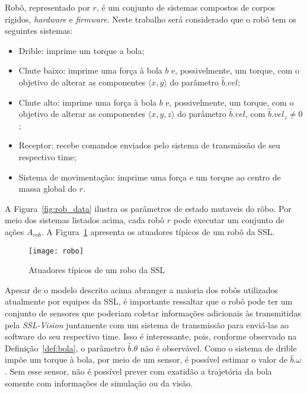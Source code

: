 \begin{defi}[Robô]
  Robô, representado por $r$, é um conjunto de sistemas compostos de corpos
  rígidos, \textit{hardware} e \textit{firmware}. Neste trabalho será
  considerado que o robô tem os seguintes sistemas:

  \begin{itemize}
    \item Drible: imprime um torque a bola;
    \item Chute baixo: imprime uma força à bola $b$ e, possivelmente, um torque,
      com o objetivo de alterar as componentes $\langle x,y \rangle$ do
      parâmetro $\hat{b}.vel$;
    \item Chute alto: imprime uma força à bola $b$ e, possivelmente, um torque,
      com o objetivo de alterar as componentes $\langle x,y,z \rangle$ do
      parâmetro $\hat{b}.vel$, com $\hat{b}.vel_z \neq 0$;
    \item Receptor: recebe comandos enviados pelo sistema de transmissão de seu
      respectivo time;
    \item Sistema de movimentação: imprime uma força e um torque ao centro de
      massa global do $r$.
  \end{itemize}
\end{defi}

A Figura~\ref{fig:rob_data} ilustra os parâmetros de estado mutaveis do rôbo.
Por meio dos sistemas listados acima, cada robô $r$ pode executar um conjunto de
ações $A_{rob}$. A Figura~\ref{fig:robo} apresenta os atuadores típicos de um
robô da SSL.

\begin{figure}[H]
  \centering
  \texttt{[image: robo]}
  \caption{Atuadores típicos de um robo da SSL}\label{fig:robo}
\end{figure}

Apesar de o modelo descrito acima abranger a maioria dos robôs utilizados
atualmente por equipes da SSL, é importante ressaltar que o robô pode ter um
conjunto de sensores que poderiam coletar informações adicionais às transmitidas
pela \textit{SSL-Vision} juntamente com um sistema de transmissão para enviá-las
ao software do seu respectivo time. Isso é interessante, pois, conforme
observado na Definição~\ref{def:bola}, o parâmetro $\hat{b}.\theta$ não é
observável. Como o sistema de drible impõe um torque à bola, por meio de um
sensor, é possível estimar o valor de $\hat{b}.\omega$. Sem esse sensor, não é
possível prever com exatidão a trajetória da bola somente com informações de
simulação ou da visão.


